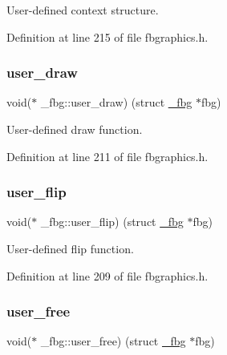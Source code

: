 User-\/defined context structure. 



Definition at line 215 of file fbgraphics.\+h.

\mbox{\label{struct__fbg_ac66a762877982c6f381a7cfd54a8f17e}} 
\subsubsection{\texorpdfstring{user\+\_\+draw}{user\_draw}}
{\footnotesize\ttfamily void($\ast$ \+\_\+fbg\+::user\+\_\+draw) (struct \mbox{\hyperlink{struct__fbg}{\+\_\+fbg}} $\ast$fbg)}



User-\/defined draw function. 



Definition at line 211 of file fbgraphics.\+h.

\mbox{\label{struct__fbg_a3f2ad2eb06555cdbe2d18f541231cb37}} 
\subsubsection{\texorpdfstring{user\+\_\+flip}{user\_flip}}
{\footnotesize\ttfamily void($\ast$ \+\_\+fbg\+::user\+\_\+flip) (struct \mbox{\hyperlink{struct__fbg}{\+\_\+fbg}} $\ast$fbg)}



User-\/defined flip function. 



Definition at line 209 of file fbgraphics.\+h.

\mbox{\label{struct__fbg_a88d48b502672cfb8bd2c94ea3feac8d0}} 
\subsubsection{\texorpdfstring{user\+\_\+free}{user\_free}}
{\footnotesize\ttfamily void($\ast$ \+\_\+fbg\+::user\+\_\+free) (struct \mbox{\hyperlink{struct__fbg}{\+\_\+fbg}} $\ast$fbg)}




